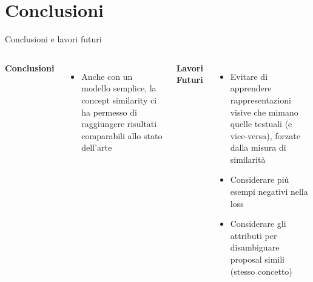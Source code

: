 \documentclass{beamer}
\begin{document}
\section{Conclusioni}

\begin{frame}{Conclusioni e lavori futuri}
  \begin{columns}
      \textbf{Conclusioni}
      \begin{itemize}
        \item Anche con un modello semplice, la concept similarity ci
        ha permesso di raggiungere risultati \alert{comparabili} allo
        stato dell'arte
      \end{itemize}
      \textbf{Lavori Futuri}
      \begin{itemize}
        \item Evitare di apprendere \alert{rappresentazioni visive che
        mimano} quelle testuali (e vice-versa), forzate dalla misura
        di similarità
        \item Considerare più \alert{esempi negativi} nella loss
        \item Considerare gli \alert{attributi} per disambiguare
        proposal simili (stesso concetto)
      \end{itemize}
  \end{columns}
\end{frame}
\end{document}
